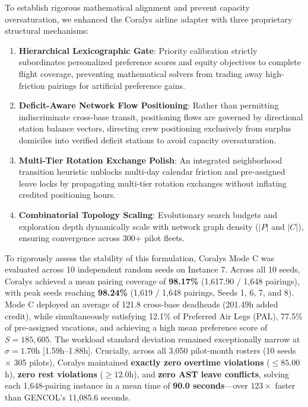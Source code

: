 \documentclass[journal]{IEEEtran}
\begin{document}
To establish rigorous mathematical alignment and prevent capacity oversaturation, we enhanced the Coralys airline adapter with three proprietary structural mechanisms:
\begin{enumerate}
    \item \textbf{Hierarchical Lexicographic Gate}: Priority calibration strictly subordinates personalized preference scores and equity objectives to complete flight coverage, preventing mathematical solvers from trading away high-friction pairings for artificial preference gains.
    \item \textbf{Deficit-Aware Network Flow Positioning}: Rather than permitting indiscriminate cross-base transit, positioning flows are governed by directional station balance vectors, directing crew positioning exclusively from surplus domiciles into verified deficit stations to avoid capacity oversaturation.
    \item \textbf{Multi-Tier Rotation Exchange Polish}: An integrated neighborhood transition heuristic unblocks multi-day calendar friction and pre-assigned leave locks by propagating multi-tier rotation exchanges without inflating credited positioning hours.
    \item \textbf{Combinatorial Topology Scaling}: Evolutionary search budgets and exploration depth dynamically scale with network graph density ($|P|$ and $|C|$), ensuring convergence across 300+ pilot fleets.
\end{enumerate}

To rigorously assess the stability of this formulation, Coralys Mode C was evaluated across 10 independent random seeds on Instance 7. Across all 10 seeds, Coralys achieved a mean pairing coverage of \textbf{98.17\%} (1,617.90 / 1,648 pairings), with peak seeds reaching \textbf{98.24\%} (1,619 / 1,648 pairings, Seeds 1, 6, 7, and 8). Mode C deployed an average of 121.8 cross-base deadheads (201.49h added credit), while simultaneously satisfying 12.1\% of Preferred Air Legs (PAL), 77.5\% of pre-assigned vacations, and achieving a high mean preference score of $S = 185,605$. The workload standard deviation remained exceptionally narrow at $\sigma = 1.70$h [1.59h--1.88h]. Crucially, across all 3,050 pilot-month rosters (10 seeds $\times$ 305 pilots), Coralys maintained \textbf{exactly zero overtime violations} ($\le 85.00$h), \textbf{zero rest violations} ($\ge 12.0$h), and \textbf{zero AST leave conflicts}, solving each 1,648-pairing instance in a mean time of \textbf{90.0 seconds}---over $123\times$ faster than GENCOL's 11,085.6 seconds.
\end{document}
